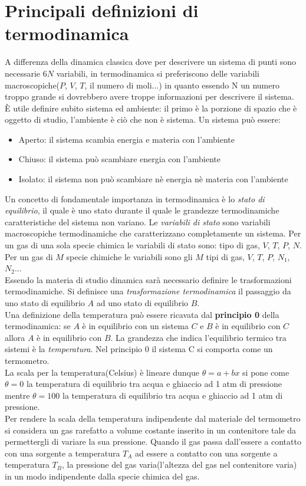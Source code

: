 \documentclass{article}
\begin{document}
\section*{Principali definizioni di termodinamica}
A differenza della dinamica classica dove per descrivere un sistema di punti sono necessarie $6N$ variabili, in termodinamica si preferiscono delle variabili macroscopiche($P$, $V$, $T$, il numero di moli...) in quanto essendo N un numero troppo grande si dovrebbero avere troppe informazioni per descrivere il sistema. È utile definire subito sistema ed ambiente: il primo è la porzione di spazio che è oggetto di studio, l'ambiente è ciò che non è sistema. Un sistema può essere: \begin{itemize} \item Aperto: il sistema scambia energia e materia con l'ambiente
\item Chiuso: il sistema può scambiare energia con l'ambiente
\item Isolato: il sistema non può scambiare nè energia nè materia con l'ambiente
\end{itemize}
Un concetto di fondamentale importanza in termodinamica è lo \textit{stato di equilibrio}, il quale è uno stato durante il quale le grandezze termodinamiche caratteristiche del sistema non variano. Le \textit{variabili di stato} sono variabili macroscopiche termodinamiche che caratterizzano completamente un sistema. 
Per un gas di una sola specie chimica le variabili di stato sono: tipo di gas, $V$, $T$, $P$, $N$. Per un gas di $M$ specie chimiche le variabili sono gli $M$ tipi di gas, $V$, $T$, $P$, $N_1$, $N_2$...\\
Essendo la materia di studio dinamica sarà necessario definire le trasformazioni termodinamiche. Si definisce una \textit{trasformazione termodinamica} il passaggio da uno stato di equilibrio $A$ ad uno stato di equilibrio $B$. \\ Una definizione della temperatura può essere ricavata dal \textbf{principio 0} della termodinamica: se $A$ è in equilibrio con un sistema $C$ e $B$ è in equilibrio con $C$ allora $A$ è in equilibrio con $B$. La grandezza che indica l'equilibrio termico tra sistemi è la \textit{temperatura}. Nel principio 0 il sistema C si comporta come un termometro. \\ La scala per la temperatura(Celsius) è lineare dunque $\theta=a+bx$ si pone come $\theta=0$ la temperatura di equilibrio tra acqua e ghiaccio ad 1 atm di pressione mentre $\theta=100$ la temperatura di equilibrio tra acqua e ghiaccio ad 1 atm di pressione. \\ Per rendere la scala della temperatura indipendente dal materiale del termometro si considera un gas rarefatto a volume costante inserito in un contenitore tale da permettergli di variare la sua pressione. Quando il gas passa dall'essere a contatto con una sorgente a temperatura $T_A$ ad essere a contatto con una sorgente a temperatura $T_B$, la pressione del gas varia(l'altezza del gas nel contenitore varia) in un modo indipendente dalla specie chimica del gas.\\
\end{document}
